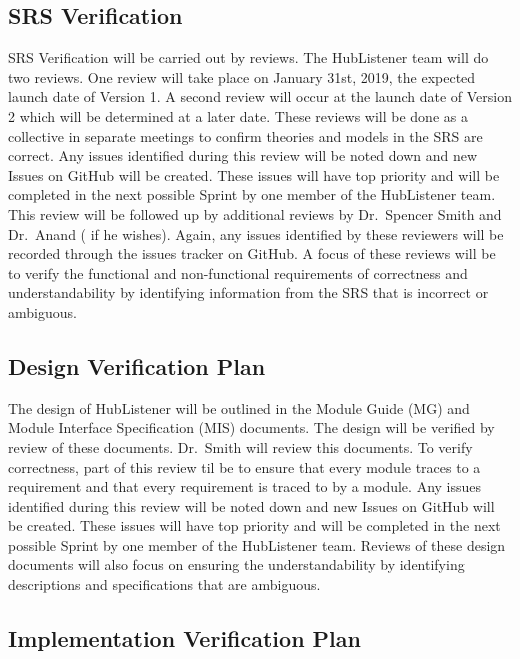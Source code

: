 \documentclass[12pt, titlepage]{article}
\begin{document}
\subsection{SRS Verification}

SRS Verification will be carried out by reviews. The HubListener team will do two reviews. One review will take place on January 31st, 2019, the expected launch date of Version 1. A second review will occur at the launch date of Version 2 which will be determined at a later date. These reviews will be done as a collective in separate meetings to confirm theories and models in the SRS are correct. Any issues identified during this review will be noted down and new Issues on GitHub will be created. These issues will have top priority and will be completed in the next possible Sprint by one member of the HubListener team. This review will be followed up by additional reviews by Dr.~Spencer Smith and Dr.~Anand ( if he wishes). Again, any issues identified by these reviewers will be recorded through the issues tracker on GitHub. A focus of these reviews will be to verify the functional and non-functional requirements of correctness and understandability by identifying information from the SRS that is incorrect or ambiguous. 

\subsection{Design Verification Plan}

The design of HubListener will be outlined in the Module Guide (MG) and Module Interface Specification (MIS) documents. The design will be verified by review of these documents. Dr.~Smith will review this documents. To verify correctness, part of this review til be to ensure that every module traces to a requirement and that every requirement is traced to by a module. Any issues identified during this review will be noted down and new Issues on GitHub will be created. These issues will have top priority and will be completed in the next possible Sprint by one member of the HubListener team. Reviews of these design documents will also focus on ensuring the understandability  by identifying descriptions and specifications that are ambiguous. 

\subsection{Implementation Verification Plan}
\end{document}
